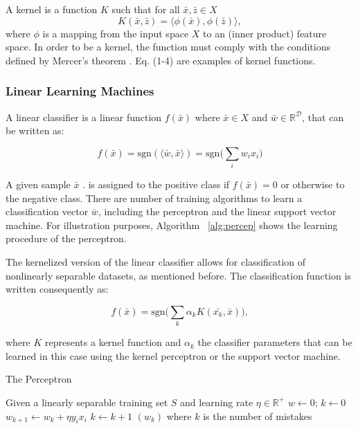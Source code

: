 A kernel is a function \(K\) such that for all \(\bar{x},\bar{z} \in X\) \[K(\bar{x},\bar{z})=\langle \phi(\bar{x}) ,\phi(\bar{z}) \rangle,\] where \(\phi\) is a mapping from the input space \(X\) to an (inner product) feature space. In order to be a kernel, the function must comply with the conditions defined by Mercer's theorem \cite{cristianini04}.  Eq. (1-4) are examples of kernel functions.

\subsubsection{Linear Learning Machines}
A linear classifier is a linear function \(f(\bar{x})\) where \(\bar{x} \in X\) and \(\bar{w} \in \mathbb{R}^\mathcal{D}\), that can be written as:

\begin{equation}
	f(\bar{x})=\text{sgn}(\langle \bar{w}, \bar{x} \rangle) = \text{sgn} \Big( \sum_{i} w_i x_i\Big)
\label{eq:eq05}
\end{equation}

A given sample \(\bar{x}\) 
.
 is assigned to the positive class if \(f(\bar{x})=0\) or otherwise to the negative class.  There are number of training algorithms to learn a classification vector \(\bar{w}\), including the perceptron\cite{rosenblatt58} and the linear support vector machine\cite{cristianini00}.  For illustration purposes, Algorithm ~\ref{alg:percep} shows the learning procedure of the perceptron.

The kernelized version of the linear classifier allows for classification of nonlinearly separable datasets, as mentioned before.  The classification function is written consequently as:

\begin{equation}
	f(\bar{x}) = \text{sgn}\Big( \sum_{k} \alpha_k K(\bar{x_k},\bar{x}) \Big),
\label{eq:eq06}
\end{equation}

where \(K\) represents a kernel function and \(\alpha_k\) the classifier parameters that can be learned in this case using the kernel perceptron\cite{freund99} or the support vector machine\cite{vapnik95, cristianini00}. 

\begin{algorithm}[ht]
	\caption{\textsf{The Perceptron}} 
	\begin{algorithmic}
		\REQUIRE Given a linearly separable training set $S$ and learning rate $\eta \in \mathbb{R}^+$ 
		\STATE $w \gets 0$; $k \gets 0$
		\REPEAT 
						\STATE $w_{k+1} \gets w_k + \eta y_i x_i$
						\STATE $k \gets k + 1$
					\ENDIF
				\ENDFOR				
		\ENSURE $(w_k)$ where $k$ is the number of mistakes
	\end{algorithmic}
  \label{alg:percep}
\end{algorithm}

